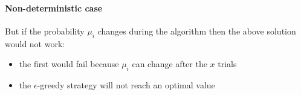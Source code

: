 \paragraph{Non-deterministic case}
But if the probability $\mu_i$ changes during the algorithm then the above solution would not work:
\begin{itemize}
\item the first would fail because $\mu_i$ can change after the $x$ trials
\item the $\epsilon$-greedy strategy will not reach an optimal value
\end{itemize}
